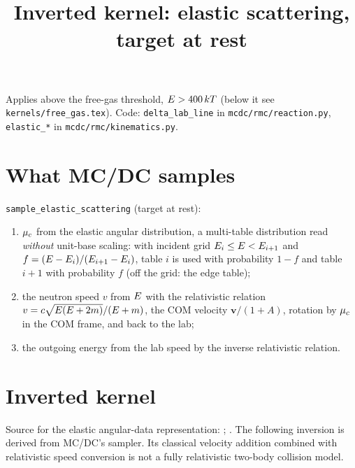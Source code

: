 \documentclass[11pt]{article}
\title{Inverted kernel: elastic scattering, target at rest}
\date{}
\begin{document}
\maketitle

\noindent Applies above the free-gas threshold, $E > 400\,kT$ (below it see
\texttt{kernels/free\_gas.tex}). Code: \texttt{delta\_lab\_line} in
\texttt{mcdc/rmc/reaction.py}, \texttt{elastic\_*} in \texttt{mcdc/rmc/kinematics.py}.

\section{What MC/DC samples}

\texttt{sample\_elastic\_scattering} (target at rest):
\begin{enumerate}
  \item $\mu_{c}$ from the elastic angular distribution, a multi-table distribution read
  \emph{without} unit-base scaling: with incident grid $E_i \le E < E_{i+1}$ and
  $f = (E - E_i)/(E_{i+1} - E_i)$, table $i$ is used with probability $1-f$ and
  table $i+1$ with probability $f$ (off the grid: the edge table);
  \item the neutron speed $v$ from $E$ with the relativistic relation
  $v = c\sqrt{E(E + 2m)}/(E + m)$, the COM velocity $\bm v/(1+A)$, rotation
  by $\mu_{c}$ in the COM frame, and back to the lab;
  \item the outgoing energy from the lab speed by the inverse relativistic relation.
\end{enumerate}

\section{Inverted kernel}

\noindent Source for the elastic angular-data representation:
; . The following inversion is derived
from MC/DC's sampler. Its classical velocity addition combined with relativistic
speed conversion is not a fully relativistic two-body collision model.
\end{document}
